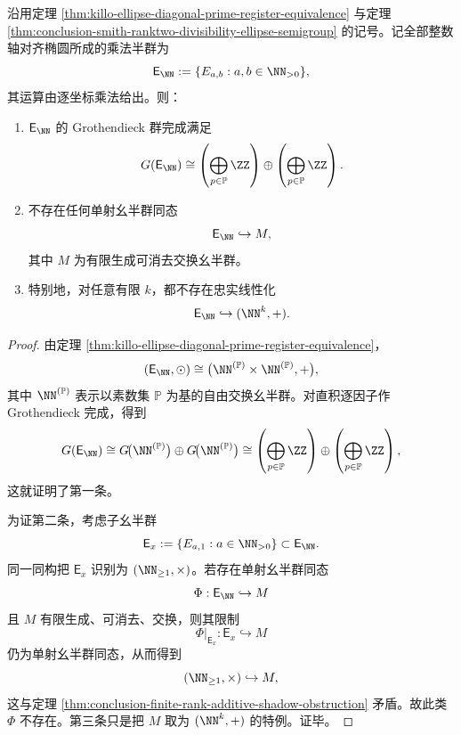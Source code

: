 \begin{theorem}\label{thm:conclusion-integer-ellipse-grothendieck-double-countable-rank}
沿用定理 \ref{thm:killo-ellipse-diagonal-prime-register-equivalence} 与定理 \ref{thm:conclusion-smith-ranktwo-divisibility-ellipse-semigroup} 的记号。记全部整数轴对齐椭圆所成的乘法半群为
\[
\mathsf E_{\NN}:=\{E_{a,b}:a,b\in\NN_{>0}\},
\]
其运算由逐坐标乘法给出。则：
\begin{enumerate}
  \item \(\mathsf E_{\NN}\) 的 Grothendieck 群完成满足
  \[
  G(\mathsf E_{\NN})
  \cong
  \left(\bigoplus_{p\in\mathbb P}\ZZ\right)
  \oplus
  \left(\bigoplus_{p\in\mathbb P}\ZZ\right).
  \]
  \item 不存在任何单射幺半群同态
  \[
  \mathsf E_{\NN}\hookrightarrow M,
  \]
  其中 \(M\) 为有限生成可消去交换幺半群。
  \item 特别地，对任意有限 \(k\)，都不存在忠实线性化
  \[
  \mathsf E_{\NN}\hookrightarrow (\NN^k,+).
  \]
\end{enumerate}
\end{theorem}
\begin{proof}
由定理 \ref{thm:killo-ellipse-diagonal-prime-register-equivalence}，
\[
(\mathsf E_{\NN},\odot)\cong
\bigl(\NN^{(\mathbb P)}\times \NN^{(\mathbb P)},+\bigr),
\]
其中 \(\NN^{(\mathbb P)}\) 表示以素数集 \(\mathbb P\) 为基的自由交换幺半群。对直积逐因子作 Grothendieck 完成，得到
\[
G(\mathsf E_{\NN})
\cong
G\!\bigl(\NN^{(\mathbb P)}\bigr)\oplus G\!\bigl(\NN^{(\mathbb P)}\bigr)
\cong
\left(\bigoplus_{p\in\mathbb P}\ZZ\right)\oplus
\left(\bigoplus_{p\in\mathbb P}\ZZ\right),
\]
这就证明了第一条。

为证第二条，考虑子幺半群
\[
\mathsf E_x:=\{E_{a,1}:a\in\NN_{>0}\}\subset\mathsf E_{\NN}.
\]
同一同构把 \(\mathsf E_x\) 识别为 \((\NN_{\ge1},\times)\)。若存在单射幺半群同态
\[
\Phi:\mathsf E_{\NN}\hookrightarrow M
\]
且 \(M\) 有限生成、可消去、交换，则其限制
\[
\Phi|_{\mathsf E_x}:\mathsf E_x\hookrightarrow M
\]
仍为单射幺半群同态，从而得到
\[
(\NN_{\ge1},\times)\hookrightarrow M,
\]
这与定理 \ref{thm:conclusion-finite-rank-additive-shadow-obstruction} 矛盾。故此类 \(\Phi\) 不存在。第三条只是把 \(M\) 取为 \((\NN^k,+)\) 的特例。证毕。
\end{proof}



